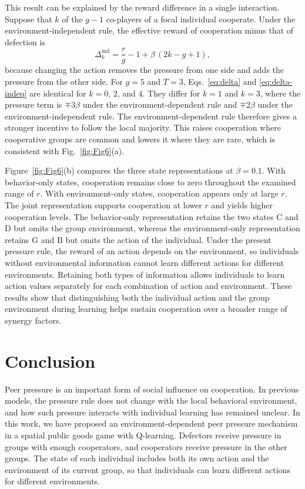 \documentclass[%
  aip,cha,
  amsmath,amssymb,
  reprint,
  floatfix,
  article-title,
]{revtex4-2}
\begin{document}
This result can be explained by the reward difference in a single interaction. Suppose that $k$ of the $g-1$ co-players of a focal individual cooperate. Under the environment-independent rule, the effective reward of cooperation minus that of defection is
\begin{equation}
\Delta_k^{\mathrm{ind}}=\frac{r}{g}-1+\beta\,(2k-g+1),
\label{eq:delta-indep}
\end{equation}
because changing the action removes the pressure from one side and adds the pressure from the other side. For $g=5$ and $T=3$, Eqs.~\eqref{eq:delta} and \eqref{eq:delta-indep} are identical for $k=0$, $2$, and $4$. They differ for $k=1$ and $k=3$, where the pressure term is $\mp3\beta$ under the environment-dependent rule and $\mp2\beta$ under the environment-independent rule. The environment-dependent rule therefore gives a stronger incentive to follow the local majority. This raises cooperation where cooperative groups are common and lowers it where they are rare, which is consistent with Fig.~\ref{fig:Fig6}(a).

Figure~\ref{fig:Fig6}(b) compares the three state representations at $\beta=0.1$. With behavior-only states, cooperation remains close to zero throughout the examined range of $r$. With environment-only states, cooperation appears only at large $r$. The joint representation supports cooperation at lower $r$ and yields higher cooperation levels. The behavior-only representation retains the two states $\mathrm{C}$ and $\mathrm{D}$ but omits the group environment, whereas the environment-only representation retains $\mathrm{G}$ and $\mathrm{B}$ but omits the action of the individual. Under the present pressure rule, the reward of an action depends on the environment, so individuals without environmental information cannot learn different actions for different environments. Retaining both types of information allows individuals to learn action values separately for each combination of action and environment. These results show that distinguishing both the individual action and the group environment during learning helps sustain cooperation over a broader range of synergy factors.


\section{Conclusion}\label{sec:conclusion}

Peer pressure is an important form of social influence on cooperation.\cite{yang2015peer,deng2018peer,gao2023impact,ma2025evolution} In previous models, the pressure rule does not change with the local behavioral environment, and how such pressure interacts with individual learning\cite{xie2026reinforcement,zheng2026brief} has remained unclear. In this work, we have proposed an environment-dependent peer pressure mechanism in a spatial public goods game with Q-learning. Defectors receive pressure in groups with enough cooperators, and cooperators receive pressure in the other groups. The state of each individual includes both its own action and the environment of its current group, so that individuals can learn different actions for different environments.
\end{document}
